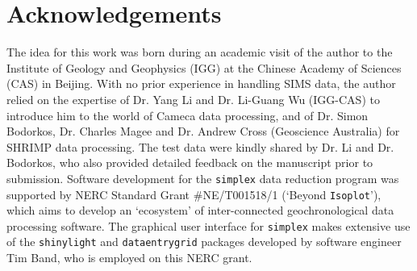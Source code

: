 \documentclass{article}
\begin{document}
\section*{Acknowledgements}
The idea for this work was born during an academic visit of the author
to the Institute of Geology and Geophysics (IGG) at the Chinese
Academy of Sciences (CAS) in Beijing. With no prior experience in
handling SIMS data, the author relied on the expertise of Dr. Yang Li
and Dr. Li-Guang Wu (IGG-CAS) to introduce him to the world of Cameca
data processing, and of Dr. Simon Bodorkos, Dr. Charles Magee and
Dr. Andrew Cross (Geoscience Australia) for SHRIMP data
processing. The test data were kindly shared by Dr. Li and
Dr. Bodorkos, who also provided detailed feedback on the manuscript
prior to submission. Software development for the \texttt{simplex}
data reduction program was supported by NERC Standard Grant
\#NE/T001518/1 (`Beyond \texttt{Isoplot}'), which aims to develop an
`ecosystem' of inter-connected geochronological data processing
software. The graphical user interface for \texttt{simplex} makes
extensive use of the \texttt{shinylight} and \texttt{dataentrygrid}
packages developed by software engineer Tim Band, who is employed on
this NERC grant.



\end{document}
